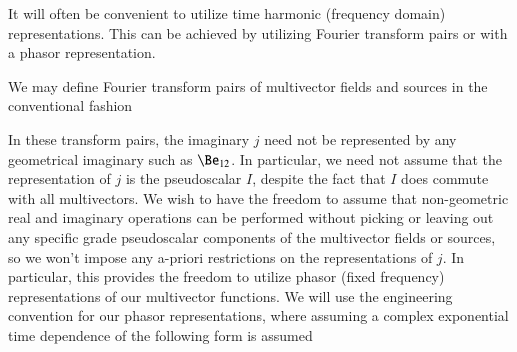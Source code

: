 %
%
\label{fourier}
It will often be convenient to utilize time harmonic (frequency domain) representations.
This can be achieved by utilizing Fourier transform pairs or with a phasor representation.

We may define Fourier transform pairs of multivector fields and sources in the conventional fashion


In these transform pairs, the imaginary \( j \) need not be represented by any geometrical imaginary such as \( \Be_{12} \).
In particular, we need not assume that the representation of \( j \) is the
 pseudoscalar \( I \), despite the fact that \( I \) does commute with all  multivectors.
We wish to have the freedom to
assume that non-geometric real and imaginary operations can be performed without picking or leaving out any specific grade pseudoscalar components of the multivector fields or sources, so we won't impose any a-priori restrictions on the representations of \( j \).
In particular, this provides the freedom to utilize phasor (fixed frequency) representations of our multivector functions.
We will use the engineering convention for our
phasor representations, where assuming a complex exponential time dependence of the following form is assumed


